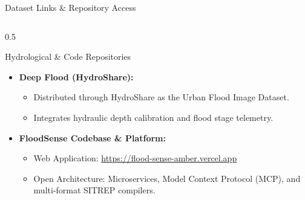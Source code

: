 \documentclass[aspectratio=169, 10pt, professionalfonts]{beamer}
\begin{document}
\begin{frame}{Dataset Links \& Repository Access}
\begin{columns}[T]
    \begin{column}{0.5\textwidth}
      \begin{block}{Hydrological \& Code Repositories}
        \begin{itemize}\setlength{\itemsep}{0.6em}\footnotesize
          \item \textbf{Deep Flood (HydroShare):}
            \begin{itemize}\scriptsize
              \item Distributed through HydroShare as the Urban Flood Image Dataset.
              \item Integrates hydraulic depth calibration and flood stage telemetry.
            \end{itemize}
          \item \textbf{FloodSense Codebase \& Platform:}
            \begin{itemize}\scriptsize
              \item Web Application: \url{https://flood-sense-amber.vercel.app}
              \item Open Architecture: Microservices, Model Context Protocol (MCP), and multi-format SITREP compilers.
            \end{itemize}
        \end{itemize}
      \end{block}
    \end{column}
  \end{columns}
\end{frame}
\end{document}
